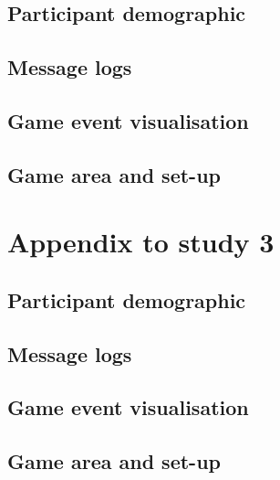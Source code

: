\section{Participant demographic}

\section{Message logs}

\section{Game event visualisation}

\section{Game area and set-up}

\chapter{Appendix to study 3}

\section{Participant demographic}

\section{Message logs}

\section{Game event visualisation}

\section{Game area and set-up}

